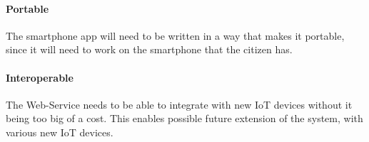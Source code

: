 \paragraph{Portable}
The smartphone app will need to be written in a way that makes it portable, since it will need to work on the smartphone that the citizen has. 

\paragraph{Interoperable}
The Web-Service needs to be able to integrate with new IoT devices without it being too big of a cost. This enables possible future extension of the system, with various new IoT devices.
